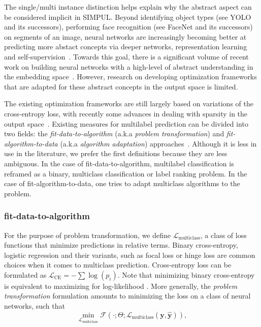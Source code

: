 The single/multi instance distinction helps explain why the abstract aspect
can be considered implicit in SIMPUL. Beyond identifying object types (see
YOLO \cite{YOLO} and its successors), performing face recognition (see FaceNet
\cite{FaceNet} and its successors) on segments of an image, neural networks
are increasingly becoming better at predicting more abstact concepts via
deeper networks, representation learning and self-supervision~\citep[see,
e.g.,][]{SS,Rep}. Towards this goal, there is a significant volume of recent
work on building neural networks with a high-level of abstract understanding
in the embedding space~. However, research on developing optimization
frameworks that are adapted for these abstract concepts in the output space is
limited.

The existing optimization frameworks are still largely based on variations of
the cross-entropy loss, with recently some advances in dealing with
sparsity in the output space~\citep[see, e.g.,][]{focalLoss,tencent}. Existing measures for multilabel prediction can be
divided into two fields: the \emph{fit-data-to-algorithm} (a.k.a \emph{problem transformation}) and \emph{fit-algorithm-to-data} (a.k.a \emph{algorithm
adaptation}) approaches~\cite{multilabelReview}. Although it is less in use in the literature, we prefer the first definitions because they are less ambiguous. In the case of fit-data-to-algorithm,
multilabel classification is reframed as a binary, multiclass classification
or label ranking problem. In the case of fit-algorithm-to-data, one tries to
adapt multiclass algorithms to the problem.

\subsubsection{fit-data-to-algorithm} For the purpose of problem transformation,
we define \(\mathcal{L}_{\text {multiclass}}\), a class of loss functions that
minimize predictions in relative terms. Binary cross-entropy, logistic regression and their
variants, such as focal loss or hinge loss are common choices when it comes to
multiclass prediction. Cross-entropy loss can be formulated as
\(\mathcal{L}_{\text {CE}}=-\sum \log \left(p_{i}\right)\). Note that
minimizing binary cross-entropy is equivalent to maximizing for log-likelihood
\cite[Section 4.3.4]{Bishop}. More generally, the \emph{problem
transformation} formulation amounts to minimizing the loss on a class of
neural networks, such that
%
\begin{equation}
\underset{\mathcal{L}_{\text {multiclass}}} {\min} \mathcal{F}\left(\cdot ;
\Theta; \mathcal{L}_{\text {multiclass}} (\mathbf{y}, \hat{\mathbf{y}})
\right),
\end{equation}
%


